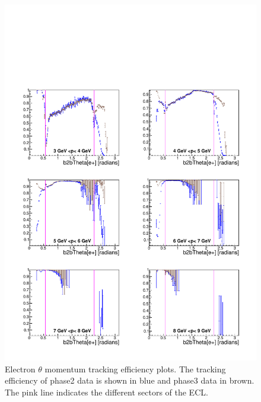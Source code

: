 \documentclass[a4paper,11pt,twosided,final,german,openbib,pdftex,listof=totoc,bibliography=totoc]{scrbook}
\begin{document}
\begin{figure}[!htbp]
	\centering
	\includegraphics[width=\textwidth]{Plots/comp/cMThetaem_Data.pdf}
	\caption[Momentum $\theta$ Electron Efficiency]{Electron $\theta$ momentum tracking efficiency plots. The tracking efficiency of phase2 data is shown in blue and phase3 data in brown. The pink line indicates the different sectors of the ECL.}
	\label{plt:compThetaem}
\end{figure}
\end{document}
